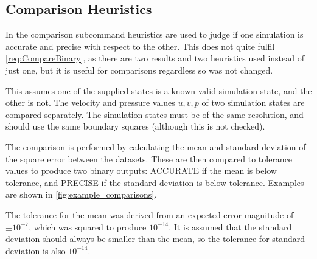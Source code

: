 \subsection{Comparison Heuristics}\label{sec:Comparisons}
In the comparison subcommand heuristics are used to judge if one simulation is accurate and precise with respect to the other.
This does not quite fulfil \cref{req:CompareBinary}, as there are two results and two heuristics used instead of just one, but it is useful for comparisons regardless so was not changed.

This assumes one of the supplied states is a known-valid simulation state, and the other is not.
The velocity and pressure values $u, v, p$ of two simulation states are compared separately.
The simulation states must be of the same resolution, and should use the same boundary squares (although this is not checked).

The comparison is performed by calculating the mean and standard deviation of the square error between the datasets.
These are then compared to tolerance values to produce two binary outputs: ACCURATE if the mean is below tolerance, and PRECISE if the standard deviation is below tolerance.
Examples are shown in \cref{fig:example_comparisons}.

The tolerance for the mean was derived from an expected error magnitude of $\pm 10^{-7}$, which was squared to produce $10^{-14}$.
It is assumed that the standard deviation should always be smaller than the mean, so the tolerance for standard deviation is also $10^{-14}$.

